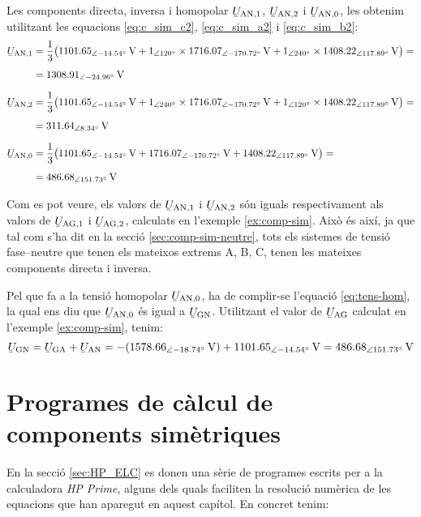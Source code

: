 \begin{exemple}
    Les components directa, inversa i homopolar $\cmplx{U}\ped{AN,1}$, $\cmplx{U}\ped{AN,2}$ i
    $\cmplx{U}\ped{AN,0}$, les obtenim utilitzant les equacions
    \eqref{eq:c_sim_c2}, \eqref{eq:c_sim_a2} i \eqref{eq:c_sim_b2}:
    \begin{align*}
        \cmplx{U}\ped{AN,1} &= \frac{1}{3} \big(
        \SIpd{1101,65}{-14,54}{V} + \numpd{1}{120} \times \SIpd{1716,07}{-170,72}{V} +
        \numpd{1}{240} \times \SIpd{1408,22}{117,89}{V} \big) =\\[1ex]
        &= \SIpd{1308,91}{-24,96}{V} \\[1.5ex]
        \cmplx{U}\ped{AN,2} &= \frac{1}{3} \big(
        \SIpd{1101,65}{-14,54}{V} + \numpd{1}{240} \times \SIpd{1716,07}{-170,72}{V} +
        \numpd{1}{120} \times \SIpd{1408,22}{117,89}{V} \big) =\\[1ex]
        &= \SIpd{311,64}{8,34}{V} \\[1.5ex]
        \cmplx{U}\ped{AN,0} &= \frac{1}{3} \big(
        \SIpd{1101,65}{-14,54}{V} + \SIpd{1716,07}{-170,72}{V} + \SIpd{1408,22}{117,89}{V} \big) = \\[1ex]
        &= \SIpd{486,68}{151,73}{V}
    \end{align*}

    Com es pot veure, els valors de $\cmplx{U}\ped{AN,1}$ i $\cmplx{U}\ped{AN,2}$ són iguals respectivament als valors de $\cmplx{U}\ped{AG,1}$ i $\cmplx{U}\ped{AG,2}$, calculats en l'exemple \ref{ex:comp-sim}.
    Això és així, ja que tal com s'ha dit en la secció \vref{sec:comp-sim-neutre}, tots els sistemes de tensió fase–neutre que tenen els mateixos extrems A, B, C, tenen les mateixes components directa i inversa.

    Pel que fa a la tensió homopolar $\cmplx{U}\ped{AN,0}$, ha de complir-se l'equació \eqref{eq:tens-hom}, la qual ens diu que $\cmplx{U}\ped{AN,0}$ és igual a $\cmplx{U}\ped{GN}$. Utilitzant el valor de  $\cmplx{U}\ped{AG}$ calculat en l'exemple \ref{ex:comp-sim}, tenim:
    \[
        \cmplx{U}\ped{GN} = \cmplx{U}\ped{GA} + \cmplx{U}\ped{AN} = -(\SIpd{1578,66}{-18,74}{V}) +
        \SIpd{1101,65}{-14,54}{V} = \SIpd{486,68}{151,73}{V}
    \]
\end{exemple}

\section{Programes de càlcul de components simètriques}\label{sec:calcul-comp-sim}

En la secció \vref{sec:HP_ELC} es donen  una sèrie de programes escrits per a la calculadora \emph{HP Prime},
 alguns dels quals faciliten la resolució numèrica de les equacions que han aparegut en aquest capítol. En concret tenim:

